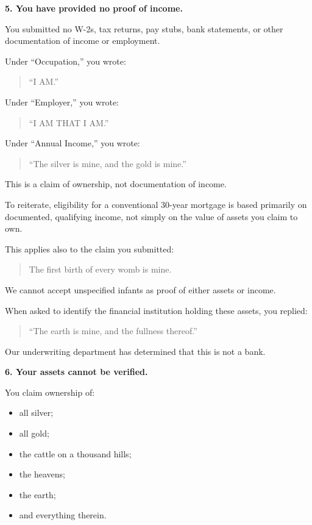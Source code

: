 {{\textbf{5. You have provided no proof of income.}

You submitted no W-2s, tax returns, pay stubs, bank statements, or other documentation of income or employment.

Under ``Occupation,'' you wrote:

\begin{quote}
``I AM.''
\end{quote}

Under ``Employer,'' you wrote:

\begin{quote}
``I AM THAT I AM.''
\end{quote}

Under ``Annual Income,'' you wrote:

\begin{quote}
``The silver is mine, and the gold is mine.''
\end{quote}

This is a claim of ownership, not documentation of income.

To reiterate, eligibility for a conventional 30-year mortgage is based primarily on documented, qualifying income, not simply on the value of assets you claim to own.

This applies also to the claim you submitted:

\begin{quote}
The first birth of every womb is mine.
\end{quote}

We cannot accept unspecified infants as proof of either assets or income.

When asked to identify the financial institution holding these assets, you replied:

\begin{quote}
``The earth is mine, and the fullness thereof.''
\end{quote}

Our underwriting department has determined that this is not a bank.

\textbf{6. Your assets cannot be verified.}

You claim ownership of:

\begin{itemize}
\item all silver;
\item all gold;
\item the cattle on a thousand hills;
\item the heavens;
\item the earth;
\item and everything therein.
\end{itemize}

}}

